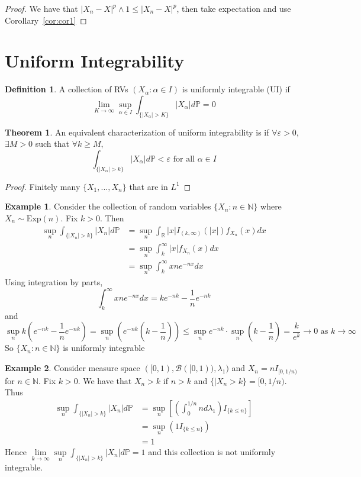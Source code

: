 \documentclass[11pt,a4paper]{article}
\theoremstyle{definition}
\newtheorem{definition}{Definition}[section]
\newtheorem{theorem}{Theorem}[section]
\newtheorem{example}{Example}[section]
\begin{document}
\begin{proof}
    We have that $|X_n - X|^p \land 1 \le |X_n - X|^p$, then take expectation and use Corollary~\ref{cor:cor1}
\end{proof}

\newpage

\section{Uniform Integrability}
\begin{definition}
    A collection of RVs $(X_{\alpha}: \alpha \in I)$ is uniformly integrable (UI) if
\[\lim_{K \to \infty} \sup_{\alpha \in I} \int_{\{|X_{\alpha}| > K\}} |X_{\alpha}| d\mathbb{P} = 0\]
\end{definition}

\begin{theorem}
An equivalent characterization of uniform integrability is if $\forall \varepsilon > 0$, $\exists M > 0$ such that $\forall k \ge M$, \[
\int _{\{|X_\alpha| > k\}} |X_\alpha| d\mathbb{P} < \varepsilon \text{  for all } \alpha \in I
\]
\end{theorem}

\begin{proof}
Finitely many $\{X_1, ..., X_n\}$ that are in $L^1$
\end{proof}

\begin{example}
Consider the collection of random variables $\{X_n: n \in \mathbb{N}\}$ where $X_n \sim \text{Exp}(n)$. Fix $k >0 $. Then \begin{align*}
    \sup \limits _{n} \int _{\{|X_n| > k\}} |X_n| d \mathbb{P} & = \sup \limits _n \int _{\mathbb{R}}|x| I_{(k, \infty)} (|x|) f_{X_n}(x)dx \\ & = \sup \limits _n \int _k ^\infty |x| f_{X_n}(x)dx \\ &= \sup \limits _n \int _{k} ^\infty xne^{-nx}dx
\end{align*}
Using integration by parts, \[
\int _k ^\infty xne^{-nx}dx = ke^{-nk} - \frac{1}{n} e^{-nk}
\]
and \[
\sup \limits _n k(e^{-nk} - \frac{1}{n} e^{-nk}) = \sup_n (e^{-nk} (k - \frac{1}{n})) \le \sup_n e^{-nk} \cdot \sup \limits _n (k- \frac{1}{n}) = \frac{k}{e^k} \to 0 \text{ as } k \to \infty
\]
So $\{X_n:n \in \mathbb{N}\}$ is uniformly integrable
\end{example}

\begin{example}
Consider measure space $([0, 1), \mathcal{B}([0,1)), \lambda_1)$ and $X_n = nI_{[0, 1/n)}$ for $n \in \mathbb{N}$. Fix $k > 0$. We have that $X_n > k$ if $n>k$ and $\{|X_n > k\} = [0, 1/n)$. Thus \begin{align*}
\sup \limits _n \int_{\{|X_n| > k\}} |X_n| d\mathbb{P} &= \sup \limits _n \left [ \left ( \int_0^{1/n} n d\lambda_1\right) I_{\{k \le n\}} \right] \\ & = \sup \limits _n (1 I_{\{k \le n\}}) \\ & = 1
\end{align*}
Hence $\lim \limits _{k \to \infty} \sup \limits _n \int _{\{|X_n| > k\}} |X_n| d\mathbb{P} = 1$ and this collection is not uniformly integrable.
\end{example}
\end{document}
